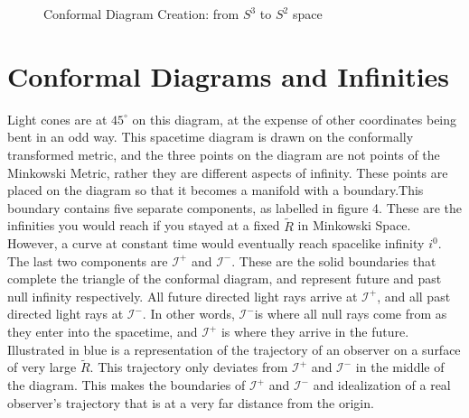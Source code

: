 \documentclass[10pt]{article}
\begin{document}
\begin{figure}[!h]
\begin{tikzpicture}[x=0.75pt,y=0.75pt,yscale=-1,xscale=1]
\end{tikzpicture}
                 \caption{Conformal Diagram Creation: from $S^3$ to $S^2$ space}
                 \label{fig:my_label}
             \end{figure}
             
  \section{Conformal Diagrams and Infinities}\label{sec:class_style}
  Light cones are at $45^\circ$ on this diagram, at the expense of other coordinates being bent in an odd way. This spacetime diagram is drawn on the conformally transformed metric, and the three points on the diagram are not points of the Minkowski Metric, rather they are different aspects of infinity. These points are placed on the diagram so that it becomes a manifold with a boundary.\newline This boundary contains five separate components, as labelled in figure 4. These are the infinities you would reach if you stayed at a fixed $\widetilde{R}$ in Minkowski Space. However, a curve at constant time would eventually reach spacelike infinity $i^0$. The last two components are $  \mathscr{I^+}$ and $  \mathscr{I^-}$. These are the solid boundaries that complete the triangle of the conformal diagram, and represent future and past null infinity respectively. All future directed light rays arrive at $  \mathscr{I^+}$, and all past directed light rays at $  \mathscr{I^-}$. In other words, $  \mathscr{I^-}$is where all null rays come from as they enter into the spacetime, and  $  \mathscr{I^+}$ is where they arrive in the future. \newline Illustrated in blue is a representation of the trajectory of an observer on a surface of very large $\widetilde{R}$. This trajectory only deviates from $\mathscr{I^+}$ and $  \mathscr{I^-}$ in the middle of the diagram. This makes the boundaries of $  \mathscr{I^+}$ and $  \mathscr{I^-}$ and idealization of a real observer's trajectory that is at a very far distance from the origin.
  
\end{document}
